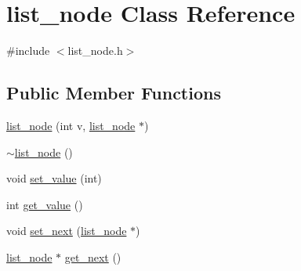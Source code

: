 \hypertarget{classlist__node}{\section{list\-\_\-node Class Reference}
\label{classlist__node}
}


{\ttfamily \#include $<$list\-\_\-node.\-h$>$}

\subsection*{Public Member Functions}
\begin{DoxyCompactItemize}
\item 
\hyperlink{classlist__node_a9b9ef19a716fe4a3e52f5f7b3739caf7}{list\-\_\-node} (int v, \hyperlink{classlist__node}{list\-\_\-node} $\ast$)
\item 
\hyperlink{classlist__node_ac703809a68a2093c70f9b9f4aa3409d1}{$\sim$list\-\_\-node} ()
\item 
void \hyperlink{classlist__node_a775315187e361ab4dd6a8a3add2ba59c}{set\-\_\-value} (int)
\item 
int \hyperlink{classlist__node_a8248fa0566e951fe9e57e3e110b73f33}{get\-\_\-value} ()
\item 
void \hyperlink{classlist__node_a9808bd1c12f8265d261793b2f60b8b95}{set\-\_\-next} (\hyperlink{classlist__node}{list\-\_\-node} $\ast$)
\item 
\hyperlink{classlist__node}{list\-\_\-node} $\ast$ \hyperlink{classlist__node_a8652a8e934c044a5d3e898629173c23f}{get\-\_\-next} ()
\end{DoxyCompactItemize}


